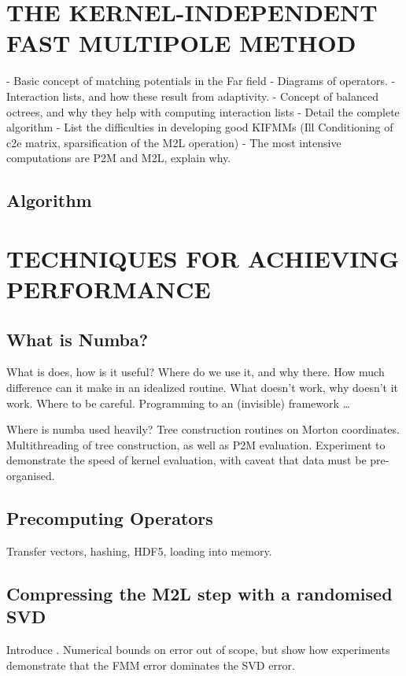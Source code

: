 \documentclass{IEEEcsmag}
\begin{document}
\section{THE KERNEL-INDEPENDENT FAST MULTIPOLE METHOD}

- Basic concept of matching potentials in the Far field
- Diagrams of operators.
- Interaction lists, and how these result from adaptivity.
- Concept of balanced octrees, and why they help with computing interaction lists
- Detail the complete algorithm
- List the difficulties in developing good KIFMMs (Ill Conditioning of c2e matrix, sparsification of the M2L operation)
- The most intensive computations are P2M and M2L, explain why.


\subsection{Algorithm}

\section{TECHNIQUES FOR ACHIEVING PERFORMANCE}

\subsection{What is Numba?}

What is does, how is it useful? Where do we use it, and why there. How much difference can it make in an idealized routine. What doesn't work, why doesn't it work. Where to be careful. Programming to an (invisible) framework \dots

Where is numba used heavily? Tree construction routines on Morton coordinates. Multithreading of tree construction, as well as P2M evaluation. Experiment to demonstrate the speed of kernel evaluation, with caveat that data must be pre-organised.

\subsection{Precomputing Operators}

Transfer vectors, hashing, HDF5, loading into memory.

\subsection{Compressing the M2L step with a randomised SVD}

Introduce \cite{Ying2004}. Numerical bounds on error out of scope, but show how experiments demonstrate that the FMM error dominates the SVD error.
\end{document}
